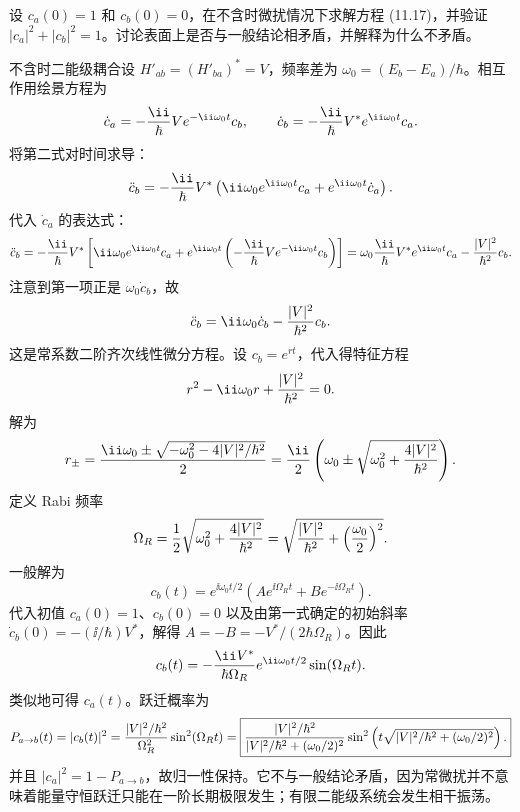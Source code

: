 \begin{question}
设 $c_a(0)=1$ 和 $c_b(0)=0$，在不含时微扰情况下求解方程 (11.17)，并验证 $|c_a|^2+|c_b|^2=1$。讨论表面上是否与一般结论相矛盾，并解释为什么不矛盾。

\par\smallskip
{}

\end{question}
\begin{solution}
不含时二能级耦合设 $H'_{ab}=(H'_{ba})^*=V$，频率差为 $\omega_0=(E_b-E_a)/\hbar$。相互作用绘景方程为
\[
\dot c_a=-{\ii\over\hbar}V e^{-\ii\omega_0t}c_b,
\qquad
\dot c_b=-{\ii\over\hbar}V^* e^{\ii\omega_0t}c_a.
\]
将第二式对时间求导：
\[
\ddot c_b=-{\ii\over\hbar}V^*\left(\ii\omega_0 e^{\ii\omega_0t}c_a+e^{\ii\omega_0t}\dot c_a\right).
\]
代入 $\dot c_a$ 的表达式：
\[
\ddot c_b=-{\ii\over\hbar}V^*\left[\ii\omega_0 e^{\ii\omega_0t}c_a
+e^{\ii\omega_0t}\left(-{\ii\over\hbar}V e^{-\ii\omega_0t}c_b\right)\right]
=\omega_0{\ii\over\hbar}V^* e^{\ii\omega_0t}c_a-{|V|^2\over\hbar^2}c_b.
\]
注意到第一项正是 $\omega_0\dot c_b$，故
\[
\ddot c_b=\ii\omega_0\dot c_b-{|V|^2\over\hbar^2}c_b.
\]
这是常系数二阶齐次线性微分方程。设 $c_b=e^{rt}$，代入得特征方程
\[
r^2-\ii\omega_0 r+{|V|^2\over\hbar^2}=0.
\]
解为
\[
r_\pm={\ii\omega_0\pm\sqrt{-\omega_0^2-4|V|^2/\hbar^2}\over2}
={\ii\over2}\left(\omega_0\pm\sqrt{\omega_0^2+{4|V|^2\over\hbar^2}}\right).
\]
定义 Rabi 频率
\[
\Omega_R={1\over2}\sqrt{\omega_0^2+{4|V|^2\over\hbar^2}}
=\sqrt{{|V|^2\over\hbar^2}+\left({\omega_0\over2}\right)^2}.
\]
一般解为
\[
c_b(t)=e^{\ii\omega_0t/2}\left(A e^{\ii\Omega_R t}+B e^{-\ii\Omega_R t}\right).
\]
代入初值 $c_a(0)=1$、$c_b(0)=0$ 以及由第一式确定的初始斜率 $\dot c_b(0)=-(\ii/\hbar)V^*$，解得 $A=-B=-V^*/(2\hbar\Omega_R)$。因此
\[
c_b(t)=-{\ii V^*\over\hbar\Omega_R}e^{\ii\omega_0t/2}\sin(\Omega_R t).
\]
类似地可得 $c_a(t)$。跃迁概率为
\[
P_{a\to b}(t)=|c_b(t)|^2
={|V|^2/\hbar^2\over\Omega_R^2}\sin^2(\Omega_R t)
=\boxed{{|V|^2/\hbar^2\over|V|^2/\hbar^2+(\omega_0/2)^2}
\sin^2\left(t\sqrt{|V|^2/\hbar^2+(\omega_0/2)^2}\right).}
\]
并且 $|c_a|^2=1-P_{a\to b}$，故归一性保持。它不与一般结论矛盾，因为常微扰并不意味着能量守恒跃迁只能在一阶长期极限发生；有限二能级系统会发生相干振荡。
\end{solution}

